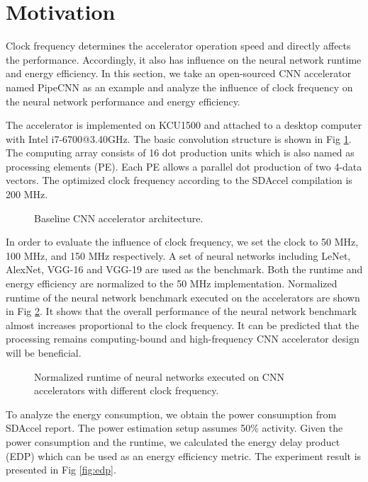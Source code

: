 \section{Motivation} \label{sec:motivation}
Clock frequency determines the accelerator operation speed 
and directly affects the performance. Accordingly, it also has influence on the 
neural network runtime and energy efficiency. In this section, we take 
an open-sourced CNN accelerator named PipeCNN \cite{pipecnn_2} as an example and analyze the 
influence of clock frequency on the neural network performance and energy efficiency.

The accelerator is implemented on KCU1500 and attached to a desktop computer with 
Intel i7-6700@3.40GHz. The basic convolution structure is shown in Fig \ref{fig:cnn-arch}. 
The computing array consists of 16 dot production units which is also named as 
processing elements (PE). Each PE allows a parallel dot production of two 4-data vectors.
The optimized clock frequency according to the SDAccel compilation 
is 200 MHz. 

\begin{figure}
    \caption{Baseline CNN accelerator architecture.}
\label{fig:cnn-arch}
\vspace{-1em}
\end{figure}

In order to evaluate the influence of clock 
frequency, we set the clock to 50 MHz, 100 MHz, and 150 MHz respectively.
A set of neural networks including LeNet, AlexNet, VGG-16 and VGG-19 are used as the benchmark.
Both the runtime and energy efficiency are normalized to the 50 MHz implementation.
Normalized runtime of the neural network benchmark executed on the accelerators are 
shown in Fig \ref{fig:computing-bound}. It shows that the 
overall performance of the neural network benchmark
almost increases proportional to the clock frequency. 
It can be predicted that the processing remains 
computing-bound and high-frequency CNN accelerator 
design will be beneficial.

\begin{figure}
    \caption{Normalized runtime of neural networks executed on CNN accelerators with different clock frequency.}
\label{fig:computing-bound}
\vspace{-1em}
\end{figure}

To analyze the energy consumption, we obtain the power consumption from SDAccel report. 
The power estimation setup assumes 50\% activity. Given the power consumption and the runtime, 
we calculated the energy delay product (EDP) which can be used as an energy efficiency metric.
The experiment result is presented in Fig \ref{fig:edp}.

